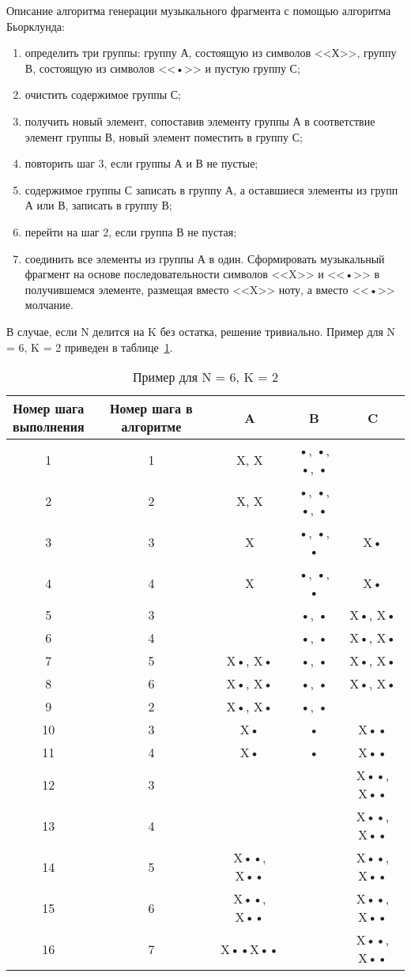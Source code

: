 Описание алгоритма генерации музыкального фрагмента с помощью алгоритма Бьорклунда:
\begin{enumerate}
	\item определить три группы: группу А, состоящую из символов <<Х>>, группу В, состоящую из символов <<•>> и пустую группу С;
	\item очистить содержимое группы С;
	\item получить новый элемент, сопоставив элементу группы А  в соответствие элемент группы В,  новый элемент поместить в группу С;
	\item повторить шаг 3, если группы А и В не пустые;
	\item содержимое группы С записать в группу А, а оставшиеся элементы из групп А или В, записать в группу В;
	\item перейти на шаг 2, если группа В не пустая;
	\item соединить все элементы из группы А в один. Сформировать музыкальный фрагмент на основе последовательности символов <<X>> и <<•>> в получившемся элементе, размещая вместо <<X>> ноту, а вместо <<•>> молчание.
\end{enumerate}
В случае, если N делится на K без остатка, решение тривиально. Пример для N = 6, K = 2 приведен в таблице~\ref{tbl:ex1}.
\begin{table}[H]
	\caption{Пример для N = 6, K = 2}
	\label{tbl:ex1}
	\begin{tabular}{|c|c|c|c|c|}
		\hline
		\makecell{Номер шага \\ выполнения} & Номер шага в алгоритме  & A & B &   C\\
		\hline
		1 & 1 & X, X & •, •, •, • &  \\
		\hline
		2 & 2 & X, X & •, •, •, • &  \\
		\hline
		3 & 3 & X & •, •, • & X• \\
		\hline
		4 & 4 & X & •, •, • & X• \\
		\hline
		5 & 3 &  & •, • & X•, X• \\
		\hline
		6 & 4 &  & •, • & X•, X•\\	
		\hline
		7 & 5 & X•, X• & •, • & X•, X• \\
		\hline
		8 & 6 & X•, X• & •, • & X•, X• \\
		\hline
		9 & 2 & X•, X• & •, • &  \\
		\hline	
		10 & 3 & X• & • & X•• \\
		\hline
		11 & 4 & X• & • & X•• \\
		\hline
		12 & 3 &  &  & X••, X•• \\
		\hline
		13 & 4 &  &  & X••, X•• \\
		\hline
		14 & 5 & X••, X•• &  & X••, X•• \\
		\hline
		15 & 6 & X••, X•• &  & X••, X•• \\
		\hline
		16 & 7 & X••X•• &  & X••, X•• \\
		\hline
	\end{tabular}
\end{table}
